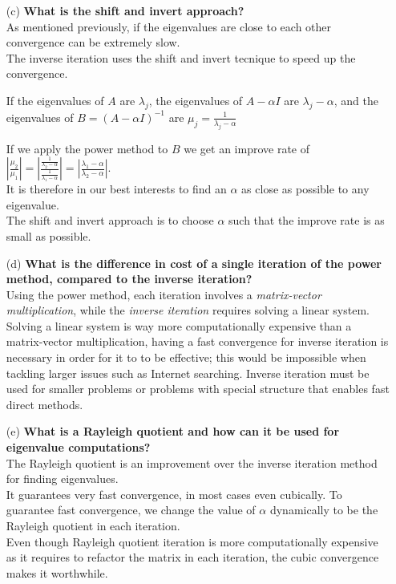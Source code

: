 \documentclass[unicode,11pt,a4paper,oneside,numbers=endperiod,openany]{scrartcl}
\begin{document}
\begin{enumerate}
\item[(c)] \textbf{What is the shift and invert approach?}\\
As mentioned previously, if the eigenvalues are close to each other convergence can be extremely slow.\\
The inverse iteration uses the shift and invert tecnique to speed up the convergence.

If the eigenvalues of $A$ are $\lambda_j$, the eigenvalues of $A -\alpha I$ are $\lambda_j - \alpha$, 
and the eigenvalues of $B = (A-\alpha I)^{-1}$ are $\mu_j = \frac{1}{\lambda_j - \alpha}$

If we apply the power method to $B$ we get an improve rate of $|\frac{\mu_2}{\mu_1}| = |\frac{\frac{1}{\lambda_2 - \alpha}}{\frac{1}{\lambda_1 - \alpha}}| = |\frac{\lambda_1 - \alpha}{\lambda_2 - \alpha}|$.\\
It is therefore in our best interests to find an $\alpha$ as close as possible to any eigenvalue.\\
The shift and invert approach is to choose $\alpha$ such that the improve rate is as small as possible.


\item[(d)] \textbf{What is the difference in cost of a single iteration of the power method, compared to the inverse iteration?}\\
Using the power method, each iteration involves a \textit{matrix-vector multiplication}, while the \textit{inverse iteration} requires solving a linear system.
Solving a linear system is way more computationally expensive than a matrix-vector multiplication, having a fast convergence for inverse iteration is necessary in order for it to to be effective; 
this would be impossible when tackling larger issues such as Internet searching.
Inverse iteration must be used for smaller problems or problems with special structure that enables fast direct methods.


\item[(e)] \textbf{What is a Rayleigh quotient and how can it be used for eigenvalue computations?}\\
The Rayleigh quotient is an improvement over the inverse iteration method for finding eigenvalues.\\
It guarantees very fast convergence, in most cases even cubically. To guarantee fast convergence, we change the value of $\alpha$ dynamically to be the Rayleigh quotient in each iteration.\\
Even though Rayleigh quotient iteration is more computationally expensive as it requires to refactor the matrix in each iteration, the cubic convergence makes it worthwhile.

\end{enumerate}
\end{document}
